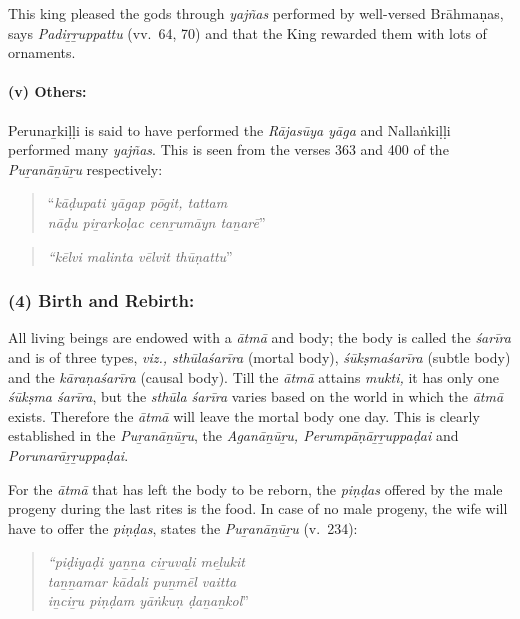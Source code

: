 This king pleased the gods through \textit{yajñas} performed by well-versed Brāhmaṇas, says \textit{Padiṟṟuppattu} (vv.~64, 70) and that the King rewarded them with lots of ornaments.


\paragraph*{(v) Others:}

\vskip -7pt

Perunaṟkiḷḷi is said to have performed the \textit{Rājasūya yāga} and Nallaṅkiḷḷi performed many \textit{yajñas}. This is seen from the verses 363 and 400 of the \textit{Puṟanāṉūṟu} respectively:

\begin{quote}
“\textit{kāḍupati yāgap pōgit, tattam}\\\textit{nāḍu piṟarkoḷac cenṟumāyn taṉarē}”
\end{quote}

\begin{quote}
\textit{“kēlvi malinta vēlvit thūṇattu}”
\end{quote}



\subsubsection*{(4) Birth and Rebirth:}

\vskip -7pt

All living beings are endowed with a \textit{ātmā} and body; the body is called the \textit{śarīra} and is of three types, \textit{viz., sthūlaśarīra} (mortal body), \textit{śūkṣmaśarīra} (subtle body) and the \textit{kāraṇaśarīra} (causal body). Till the \textit{ātmā} attains \textit{mukti,} it has only one \textit{śūkṣma śarīra}, but the \textit{sthūla śarīra} varies based on the world in which the \textit{ātmā} exists. Therefore the \textit{ātmā} will leave the mortal body one day. This is clearly established in the \textit{Puṟanāṉūṟu}, the \textit{Aganāṉūṟu, Perumpāṇāṟṟuppaḍai} and \textit{Porunarāṟṟuppaḍai}.

For the \textit{ātmā} that has left the body to be reborn, the \textit{piṇḍas} offered by the male progeny during the last rites is the food. In case of no male progeny, the wife will have to offer the \textit{piṇḍas}, states the \textit{Puṟanāṉūṟu} (v.~234):

\begin{quote}
\textit{“piḍiyaḍi yaṉṉa ciṟuvaḻi meḻukit}\\\textit{taṉṉamar kādali puṉmēl vaitta}\\\textit{iṉciṟu piṇḍam yāṅkuṇ ḍaṉaṉkol}”
\end{quote}

